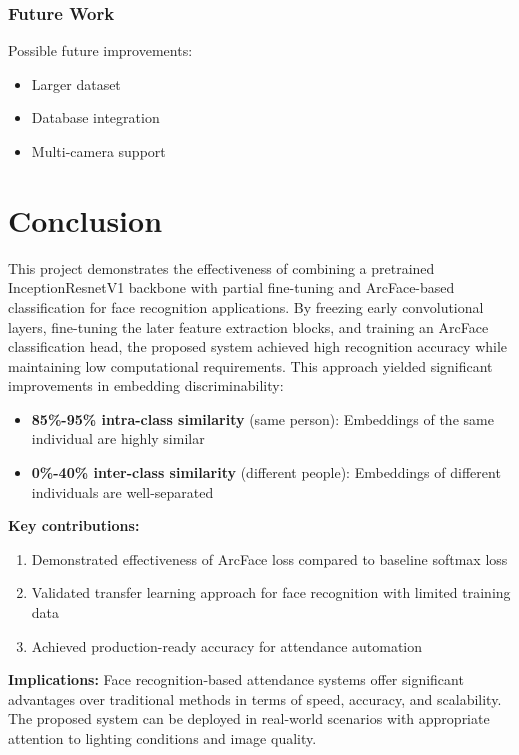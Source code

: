 \documentclass[sommairechap,stylejchiquet]{these_gi}
\begin{document}
\subsection{Future Work}
Possible future improvements:
\begin{itemize}
    \item Larger dataset
    \item Database integration
    \item Multi-camera support
\end{itemize}

\chapter{Conclusion}

This project demonstrates the effectiveness of combining a pretrained InceptionResnetV1 backbone with partial fine-tuning and ArcFace-based classification for face recognition applications. By freezing early convolutional layers, fine-tuning the later feature extraction blocks, and training an ArcFace classification head, the proposed system achieved high recognition accuracy while maintaining low computational requirements. This approach yielded significant improvements in embedding discriminability:

\begin{itemize}
    \item \textbf{85\%-95\% intra-class similarity} (same person): Embeddings of the same individual are highly similar
    \item \textbf{0\%-40\% inter-class similarity} (different people): Embeddings of different individuals are well-separated
\end{itemize}

\textbf{Key contributions:}
\begin{enumerate}
    \item Demonstrated effectiveness of ArcFace loss compared to baseline softmax loss
    \item Validated transfer learning approach for face recognition with limited training data
    \item Achieved production-ready accuracy for attendance automation
\end{enumerate}

\textbf{Implications:}
Face recognition-based attendance systems offer significant advantages over traditional methods in terms of speed, accuracy, and scalability. The proposed system can be deployed in real-world scenarios with appropriate attention to lighting conditions and image quality.
\end{document}
